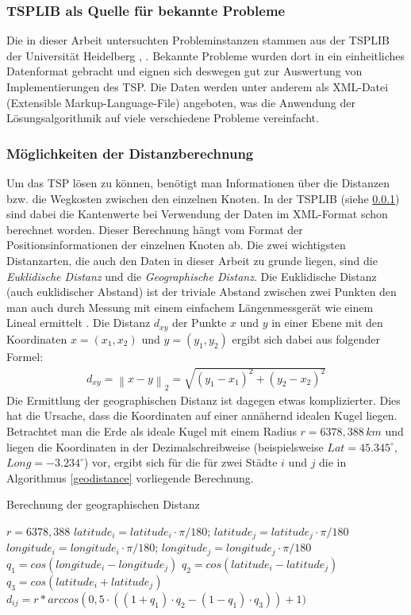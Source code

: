 \documentclass[doktyp=barbeit, sprache=german]{TUBAFarbeiten}
\begin{document}
\subsubsection{TSPLIB als Quelle für bekannte Probleme} \label{TSPLIB}
Die in dieser Arbeit untersuchten Probleminstanzen stammen aus der TSPLIB der Universität Heidelberg \cite{TSPLIB}, \cite{WebsiteTSP}. Bekannte Probleme wurden dort in ein einheitliches Datenformat gebracht und eignen sich deswegen gut zur Auswertung von Implementierungen des TSP. Die Daten werden unter anderem als XML-Datei (Extensible Markup-Language-File) angeboten, was die Anwendung der Lösungsalgorithmik auf viele verschiedene Probleme vereinfacht. 
\subsubsection{Möglichkeiten der Distanzberechnung}
Um das TSP lösen zu können, benötigt man Informationen über die Distanzen bzw. die Wegkosten zwischen den einzelnen Knoten. In der TSPLIB (siehe \ref{TSPLIB}) sind dabei die Kantenwerte bei Verwendung der Daten im XML-Format schon berechnet worden. Dieser Berechnung hängt vom Format der Positionsinformationen der einzelnen Knoten ab. Die zwei wichtigsten Distanzarten, die auch den Daten in dieser Arbeit zu grunde liegen, sind die \textit{Euklidische Distanz} und die \textit{Geographische Distanz}. Die Euklidische Distanz (auch euklidischer Abstand) ist der triviale Abstand zwischen zwei Punkten den man auch durch Messung mit einem einfachem Längenmessgerät wie einem Lineal ermittelt \cite{Distanz}. Die Distanz $d_{xy}$ der Punkte $x$ und $y$ in einer Ebene mit den Koordinaten $x = (x_1, x_2)$ und $y = (y_1, y_2)$ ergibt sich dabei aus folgender Formel:
\begin{align}
\label{eq:Euclid}
d_{xy} = \left\| x - y \right\|_2 = \sqrt{{(y_1-x_1)}^2+{(y_2-x_2)}^2}
\end{align}
Die Ermittlung der geographischen Distanz ist dagegen etwas komplizierter. Dies hat die Ursache, dass die Koordinaten auf einer annähernd idealen Kugel liegen. Betrachtet man die Erde als ideale Kugel mit einem Radius $r = 6378,388 \,km$ und liegen die Koordinaten in der Dezimalschreibweise (beispielsweise $Lat=45.345^\circ$, $Long=-3.234^\circ$) vor, ergibt sich für die für zwei Städte $i$ und $j$ die in Algorithmus \ref{geodistance} vorliegende Berechnung.
\begin{algorithm}
\caption{Berechnung der geographischen Distanz}
\label{geodistance}
\begin{algorithmic}[1]
\State $r = 6378,388$
\State $latitude_i = latitude_i \cdot \pi / 180; \,latitude_j = latitude_j \cdot \pi / 180$
\State $longitude_i = longitude_i \cdot \pi / 180;\, longitude_j =longitude_j \cdot \pi / 180$
\State $q_1 = cos(longitude_i - longitude_j)$
\State $q_2 = cos(latitude_i - latitude_j)$
\State $q_3 = cos(latitude_i + latitude_j)$
\State \textbf{$d_{ij} = r * arccos(0,5 \cdot ((1 + q_1) \cdot q_2 - (1 - q_1) \cdot q_3)) + 1)$}
\end{algorithmic}
\end{algorithm}
\end{document}
